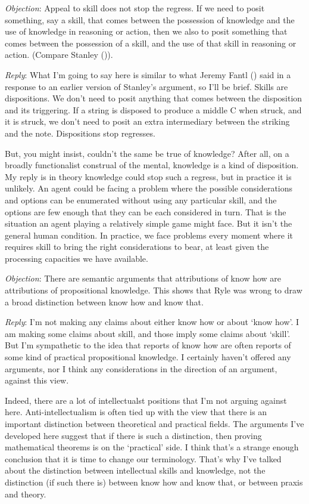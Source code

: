 \documentclass[
  11pt,
  letterpaper,
  DIV=11,
  numbers=noendperiod,
  oneside]{scrartcl}
\begin{document}
\emph{Objection}: Appeal to skill does not stop the regress. If we need
to posit something, say a skill, that comes between the possession of
knowledge and the use of knowledge in reasoning or action, then we also
to posit something that comes between the possession of a skill, and the
use of that skill in reasoning or action. (Compare Stanley
()).

\emph{Reply}: What I'm going to say here is similar to what Jeremy Fantl
() said in a response to an earlier
version of Stanley's argument, so I'll be brief. Skills are
dispositions. We don't need to posit anything that comes between the
disposition and its triggering. If a string is disposed to produce a
middle C when struck, and it is struck, we don't need to posit an extra
intermediary between the striking and the note. Dispositions stop
regresses.

But, you might insist, couldn't the same be true of knowledge? After
all, on a broadly functionalist construal of the mental, knowledge is a
kind of disposition. My reply is in theory knowledge could stop such a
regress, but in practice it is unlikely. An agent could be facing a
problem where the possible considerations and options can be enumerated
without using any particular skill, and the options are few enough that
they can be each considered in turn. That is the situation an agent
playing a relatively simple game might face. But it isn't the general
human condition. In practice, we face problems every moment where it
requires skill to bring the right considerations to bear, at least given
the processing capacities we have available.

\emph{Objection}: There are semantic arguments that attributions of know
how are attributions of propositional knowledge. This shows that Ryle
was wrong to draw a broad distinction between know how and know that.

\emph{Reply}: I'm not making any claims about either know how or about
`know how'. I am making some claims about skill, and those imply some
claims about `skill'. But I'm sympathetic to the idea that reports of
know how are often reports of some kind of practical propositional
knowledge. I certainly haven't offered any arguments, nor I think any
considerations in the direction of an argument, against this view.

Indeed, there are a lot of intellectualst positions that I'm not arguing
against here. Anti-intellectualism is often tied up with the view that
there is an important distinction between theoretical and practical
fields. The arguments I've developed here suggest that if there is such
a distinction, then proving mathematical theorems is on the `practical'
side. I think that's a strange enough conclusion that it is time to
change our terminology. That's why I've talked about the distinction
between intellectual skills and knowledge, not the distinction (if such
there is) between know how and know that, or between praxis and theory.
\end{document}
